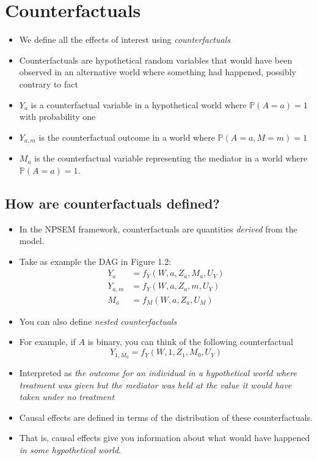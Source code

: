 \documentclass[
  12pt,
]{book}
\providecommand{\tightlist}{%
  \setlength{\itemsep}{0pt}\setlength{\parskip}{0pt}}
\theoremstyle{definition}
\theoremstyle{definition}
\theoremstyle{definition}
\renewcommand{\P}{\mathbb{P}}
\newcommand{\1}{\mathbbm{1}}
\begin{document}
\hypertarget{counterfactuals}{%
\section{Counterfactuals}\label{counterfactuals}}

\begin{itemize}
\tightlist
\item
  We define all the effects of interest using \emph{counterfactuals}
\item
  Counterfactuals are hypothetical random variables that would have been
  observed in an alternative world where something had happened, possibly
  contrary to fact 
\item
  \(Y_a\) is a counterfactual variable in a hypothetical world where \(\P(A=a)=1\)
  with probability one
\item
  \(Y_{a,m}\) is the counterfactual outcome in a world where \(\P(A=a,M=m)=1\)
\item
  \(M_a\) is the counterfactual variable representing the mediator in a world
  where \(\P(A=a)=1\).
\end{itemize}

\hypertarget{how-are-counterfactuals-defined}{%
\subsection{How are counterfactuals defined?}\label{how-are-counterfactuals-defined}}

\begin{itemize}
\tightlist
\item
  In the NPSEM framework, counterfactuals are quantities \emph{derived} from the
  model.
\item
  Take as example the DAG in Figure 1.2:
  \begin{align}
    Y_a  &= f_Y(W, a, Z_a, M_a, U_Y)\\
    Y_{a,m}  &= f_Y(W, a, Z_a, m, U_Y)\\
    M_a  &= f_M(W, a, Z_a, U_M)
  \end{align}
\item
  You can also define \emph{nested counterfactuals}
\item
  For example, if \(A\) is binary, you can think of the following counterfactual
  \begin{equation*}
    Y_{1, M_0} = f_Y(W, 1, Z_1, M_0, U_Y)
  \end{equation*}
\item
  Interpreted as \emph{the outcome for an individual in a hypothetical world where
  treatment was given but the mediator was held at the value it would have
  taken under no treatment}
\item
  Causal effects are defined in terms of the distribution of these
  counterfactuals.
\item
  That is, causal effects give you information about what would have happened
  \emph{in some hypothetical world}.
\end{itemize}
\end{document}

